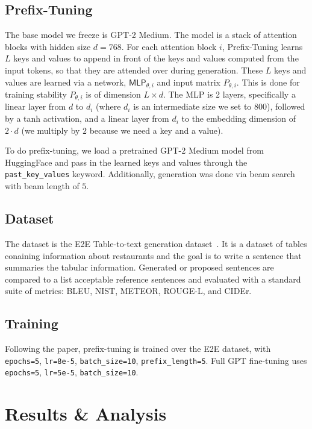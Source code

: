 \documentclass[11pt]{article} %
\begin{document}
\subsection{Prefix-Tuning}
The base model we freeze is GPT-2 Medium. The model is a stack of attention blocks with hidden size $d=768$. For each attention block $i$, Prefix-Tuning learns $L$ keys and values to append in front of the keys and values computed from the input tokens, so that they are attended over during generation. These $L$ keys and values are learned via a network, $\textsf{MLP}_{\theta,i}$ and input matrix $P_{\theta,i}$. This is done for training stability $P_{\theta,i}$ is of dimension $L\times d$. The MLP is 2 layers, specifically a linear layer from $d$ to $d_i$ (where $d_i$ is an intermediate size we set to 800), followed by a tanh activation, and a linear layer from $d_i$ to the embedding dimension of $2\cdot d$ (we multiply by $2$ because we need a key and a value).

To do prefix-tuning, we load a pretrained GPT-2 Medium model from HuggingFace and pass in the learned keys and values through the \verb|past_key_values| keyword. Additionally, generation was done via beam search with beam length of $5$.

\subsection{Dataset}
The dataset is the E2E Table-to-text generation dataset~\cite{novikova-etal-2017-e2e}. It is a dataset of tables conaining information about restaurants and the goal is to write a sentence that summaries the tabular information. Generated or proposed sentences are compared to a list acceptable reference sentences and evaluated with a standard suite of metrics: BLEU, NIST, METEOR, ROUGE-L, and CIDEr.

\subsection{Training}
Following the paper, prefix-tuning is trained over the E2E dataset, with \texttt{epochs=5}, \texttt{lr=8e-5}, \texttt{batch\_size=10}, \texttt{prefix\_length=5}. Full GPT fine-tuning uses \texttt{epochs=5}, \texttt{lr=5e-5}, \texttt{batch\_size=10}.

\section{Results \& Analysis}
\end{document}
